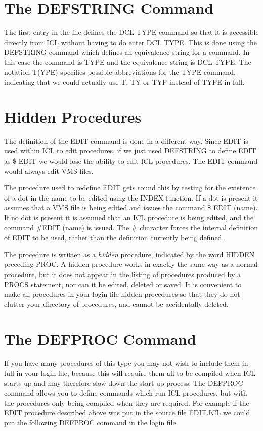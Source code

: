 \documentclass[twoside,11pt,nolof,chapters]{starlink}
\begin{document}
\section{The DEFSTRING Command}

The first entry in the file defines the DCL TYPE command so that it is
accessible directly from ICL without having to do enter DCL TYPE. This is
done using the DEFSTRING command which defines an equivalence string for
a command. In this case the command is TYPE and the equivalence string is
DCL TYPE. The notation T(YPE) specifies possible abbreviations for the
TYPE command, indicating that we could actually use T, TY or TYP instead
of TYPE in full.

\section{Hidden Procedures}

The definition of the EDIT command is done in a different way. Since EDIT
is used within ICL to edit procedures, if we just used DEFSTRING to define
EDIT as \$ EDIT we would lose the ability to edit ICL procedures. The EDIT
command would always edit VMS files.

The procedure used to redefine EDIT gets round this by testing for the
existence of a dot in the name to be edited using the INDEX function. If
a dot is present it assumes that a VMS file is being edited and issues the
command \$ EDIT (name). If no dot is present it is assumed that an ICL
procedure is being edited, and the command \#EDIT (name) is issued. The \#
character forces the internal definition of EDIT to be used, rather than
the definition currently being defined.

The procedure is written as a \emph{hidden} procedure, indicated by the word
HIDDEN preceding PROC. A hidden procedure works in exactly the same way
as a normal procedure, but it does not appear in the listing of procedures
produced by a PROCS statement, nor can it be edited, deleted or saved. It
is convenient to make all procedures in your login file hidden procedures
so that they do not clutter your directory of procedures, and cannot be
accidentally deleted.

\section{The DEFPROC Command}

If you have many procedures of this type you may not wish to include them
in full in your login file, because this will require them all to be compiled
when ICL starts up and may therefore slow down the start up process. The
DEFPROC command allows you to define commands which run ICL procedures,
but with the procedures only being compiled when they are required. For
example if the EDIT procedure described above was put in the source file
EDIT.ICL we could put the following DEFPROC command in the login file.
\end{document}
